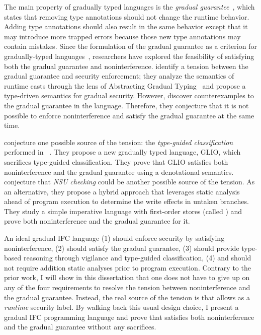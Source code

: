 The main property of gradually typed languages is the \textit{gradual
  guarantee}~\cite{Siek:2015ac}, which states that removing type annotations
should not change the runtime behavior. Adding type annotations should also
result in the same behavior except that it may introduce more trapped errors
because those new type annotations may contain mistakes. Since the formulation
of the gradual guarantee as a criterion for gradually-typed
languages~\cite{Siek:2015ac}, researchers have explored the feasibility of
satisfying both the gradual guarantee and noninterference.
\textcite{Toro:2018aa} identify a tension between the gradual guarantee and
security enforcement; they analyze the semantics of runtime casts through the
lens of Abstracting Gradual Typing~\parencite{Garcia:2016aa} and propose a
type-driven semantics for gradual security. However, \textcite{Toro:2018aa}
discover counterexamples to the gradual guarantee in the \GSLRef language.
Therefore, they conjecture that it is not possible to enforce noninterference
and satisfy the gradual guarantee at the same time.

\textcite{Amorim:2020aa} conjecture one possible source of the tension: the
\textit{type-guided classification} performed in
\GSLRef~\parencite{Toro:2018aa}. They propose a new gradually typed language,
GLIO, which sacrifices type-guided classification. They prove that GLIO
satisfies both noninterference and the gradual guarantee using a denotational
semantics.
%
\textcite{bichhawat2021gradual} conjecture that \textit{NSU checking} could be
another possible source of the tension. As an alternative, they propose a hybrid
approach that leverages static analysis ahead of program execution to determine
the write effects in untaken branches. They study a simple imperative language
with first-order stores (called \WHILEG) and prove both noninterference and the
gradual guarantee for it.

An ideal gradual IFC language (1) should enforce security by satisfying
noninterference, (2) should satisfy the gradual guarantee, (3) should provide
type-based reasoning through vigilance and type-guided classification, (4) and
should not require addition static analyses prior to program execution. Contrary
to the prior work, I will show in this dissertation that one does not have to
give up on any of the four requirements to resolve the tension between
noninterference and the gradual guarantee. Instead, the real source of the
tension is that \GSLRef allows \unk as a \emph{runtime} security label. By
walking back this usual design choice, I present a gradual IFC programming
language \Surface and prove that \Surface satisfies both noninterference and the
gradual guarantee without any sacrifices.

